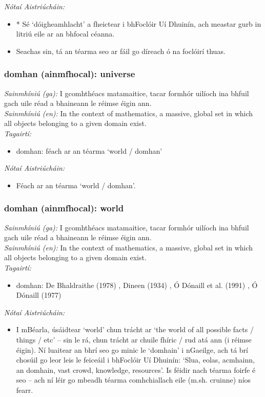 \documentclass{article}
\begin{document}
 \noindent \textit{Nótaí Aistriúcháin:}
\begin{itemize}
	\item * Sé `dóigheamhlacht' a fheictear i bhFoclóir Uí Dhuinín, ach meastar gurb in litriú eile ar an bhfocal céanna.
	\item Seachas sin, tá an téarma seo ar fáil go díreach ó na foclóirí thuas.
\end{itemize}


\subsubsection*{domhan (ainmfhocal): universe}
 \noindent \textit{Sainmhíniú (ga):} I gcomhthéacs matamaitice, tacar formhór uilíoch ina bhfuil gach uile réad a bhaineann le réimse éigin ann.
\\
 \noindent \textit{Sainmhíniú (en):} In the context of mathematics, a massive, global set in which all objects belonging to a given domain exist.
\\
 \noindent \textit{Tagairtí:}
\begin{itemize}
	\item domhan: féach ar an téarma `world / domhan'
\end{itemize}

 \noindent \textit{Nótaí Aistriúcháin:}
\begin{itemize}
	\item Féach ar an téarma `world / domhan'.
\end{itemize}


\subsubsection*{domhan (ainmfhocal): world}
 \noindent \textit{Sainmhíniú (ga):} I gcomhthéacs matamaitice, tacar formhór uilíoch ina bhfuil gach uile réad a bhaineann le réimse éigin ann.
\\
 \noindent \textit{Sainmhíniú (en):} In the context of mathematics, a massive, global set in which all objects belonging to a given domain exist.
\\
 \noindent \textit{Tagairtí:}
\begin{itemize}
	\item domhan: De Bhaldraithe (1978) \cite{de-bhaldraithe}, Dineen (1934) \cite{dineen}, Ó Dónaill et al. (1991) \cite{focloir-beag}, Ó Dónaill (1977) \cite{odonaill}
\end{itemize}

 \noindent \textit{Nótaí Aistriúcháin:}
\begin{itemize}
	\item I mBéarla, úsáidtear `world' chun trácht ar `the world of all possible facts / things / etc' -- sin le rá, chun trácht ar chuile fhíric / rud atá ann (i réimse éigin). Ní luaitear an bhrí seo go minic le `domhain' i nGaeilge, ach tá brí chosúil go leor leis le feiceáil i bhFoclóir Uí Dhuinín: `Slua, eolas, acmhainn, an domhain, vast crowd, knowledge, resources'. Is féidir nach téarma foirfe é seo -- ach ní léir go mbeadh téarma comhchiallach eile (m.sh. cruinne) níos fearr.
\end{itemize}
\end{document}
